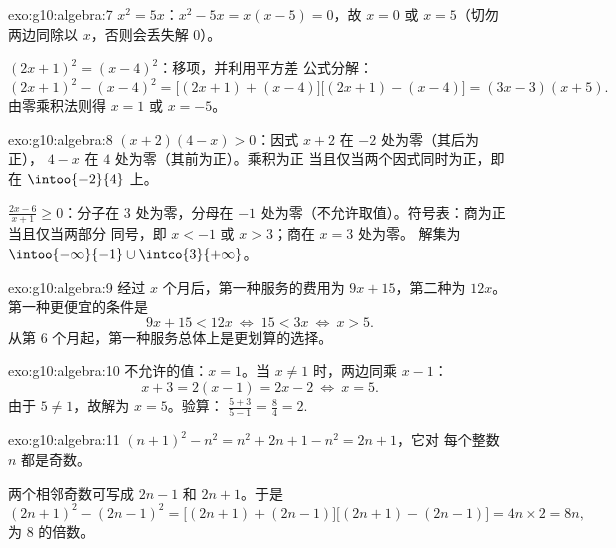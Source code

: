 \begin{solution}{exo:g10:algebra:7}
$x^2 = 5x$：$x^2 - 5x = x(x - 5) = 0$，故 $x = 0$ 或 $x = 5$（切勿
两边同除以 $x$，否则会丢失解 $0$）。

$(2x+1)^2 = (x-4)^2$：移项，并利用平方差
公式分解：
\[
(2x+1)^2 - (x-4)^2
= \bigl[(2x+1) + (x-4)\bigr]\bigl[(2x+1) - (x-4)\bigr]
= (3x - 3)(x + 5).
\]
由零乘积法则得 $x = 1$ 或 $x = -5$。
\end{solution}

\begin{solution}{exo:g10:algebra:8}
$(x+2)(4-x) > 0$：因式 $x + 2$ 在 $-2$ 处为零（其后为正），
$4 - x$ 在 $4$ 处为零（其前为正）。乘积为正
当且仅当两个因式同时为正，即在 $\intoo{-2}{4}$ 上。

$\frac{2x-6}{x+1} \geq 0$：分子在 $3$ 处为零，分母在
$-1$ 处为零（不允许取值）。符号表：商为正当且仅当两部分
同号，即 $x < -1$ 或 $x > 3$；商在 $x = 3$ 处为零。
解集为 $\intoo{-\infty}{-1} \cup \intco{3}{+\infty}$。
\end{solution}

\begin{solution}{exo:g10:algebra:9}
经过 $x$ 个月后，第一种服务的费用为 $9x + 15$，第二种为 $12x$。
第一种更便宜的条件是
\[
9x + 15 < 12x
\ \Longleftrightarrow\
15 < 3x
\ \Longleftrightarrow\
x > 5 .
\]
从第 $6$ 个月起，第一种服务总体上是更划算的选择。
\end{solution}

\begin{solution}{exo:g10:algebra:10}
不允许的值：$x = 1$。当 $x \neq 1$ 时，两边同乘 $x - 1$：
\[
x + 3 = 2(x - 1) = 2x - 2
\ \Longleftrightarrow\
x = 5 .
\]
由于 $5 \neq 1$，故解为 $x = 5$。验算：
$\frac{5+3}{5-1} = \frac84 = 2$.
\end{solution}

\begin{solution}{exo:g10:algebra:11}
$(n+1)^2 - n^2 = n^2 + 2n + 1 - n^2 = 2n + 1$，它对
每个整数 $n$ 都是奇数。

两个相邻奇数可写成 $2n - 1$ 和 $2n + 1$。于是
\[
(2n+1)^2 - (2n-1)^2
= \bigl[(2n+1)+(2n-1)\bigr]\bigl[(2n+1)-(2n-1)\bigr]
= 4n \times 2 = 8n,
\]
为 $8$ 的倍数。
\end{solution}

